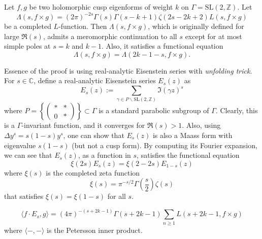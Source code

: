 \begin{theorem}
Let $f, g$ be two holomorphic cusp eigenforms of weight $k$ on $\Gamma = \mathrm{SL}(2, \mathbb{Z})$.
Let
$$
\Lambda(s, f \times g) = (2\pi)^{-2s}\Gamma(s)\Gamma(s - k + 1)\zeta(2s-2k+2)L(s, f\times g)
$$
be a completed $L$-function.
Then $\Lambda(s, f\times g)$, which is originally defined for large $\Re(s)$, admits a meromorphic continuation to all $s$ except for at most simple poles at $s = k$ and $k-1$.
Also, it satisfies a functional equation
$$
\Lambda(s, f\times g) = \Lambda(2k-1-s, f\times g).
$$
\end{theorem}
Essence of the proof is using real-analytic Eisenstein series with \emph{unfolding trick}.
For $s \in \mathbb{C}$, define a real-analytic Eisenstein series $E_{s}(z)$ as
$$
E_{s}(z):= \sum_{\gamma \in P\backslash \mathrm{SL}(2, \mathbb{Z})} \Im(\gamma z)^{s}
$$
where $P = \left\{\left(\begin{smallmatrix} * & * \\ 0 & * \end{smallmatrix}\right)\right\}\subset \Gamma$ is a standard parabolic subgroup of $\Gamma$.
Clearly, this is a $\Gamma$-invariant function, and it converges for $\Re(s) > 1$. 
Also, using $\Delta y^{s} = s(1-s)y^{s}$, one can show that $E_{s}(z)$ is also a Maass form with eigenvalue $s(1-s)$ (but not a cusp form).
By computing its Fourier expansion, we can see that $E_{s}(z)$, as a function in $s$, satisfies the functional equation 
$$
    \xi(2s)E_{s}(z) = \xi(2 - 2s)E_{1-s}(z)
$$
where $\xi(s)$ is the completed zeta function
$$
    \xi(s) = \pi^{-s/2} \Gamma\left(\frac{s}{2}\right)\zeta(s)
$$
that satisfies $\xi(s) = \xi(1-s)$ for all $s$.
\begin{proposition}
$$    
    \langle f\cdot E_{s}, g\rangle = (4\pi)^{-(s+2k-1)}\Gamma(s + 2k-1)\sum_{n\geq 1} L(s+2k-1, f\times g)
$$
where $\langle -,-\rangle$ is the Petersson inner product.
\end{proposition}
